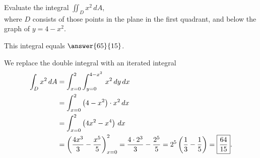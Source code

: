 \documentclass{ximera}
\author{Jim Fowler}
\begin{document}
\begin{exercise}
Evaluate the integral $\displaystyle\iint_D x^2 \, dA$, \\
where $D$ consists of those points in the plane in the first quadrant,
and below the graph of $y = 4 - x^2$.

This integral equals $\answer{65}{15}$.

\begin{hint}
 We replace the double integral with an iterated integral
     \begin{align*}
       \int_D x^2 \, dA
       &= \int_{x=0}^2 \int_{y = 0}^{4-x^2} \, x^2 \, dy \, dx \\
       &= \int_{x=0}^2 \left(4-x^2\right) \cdot x^2 \, dx \\
       &= \int_{x=0}^2 \left(4x^2-x^4\right) \, dx \\
       &= \left(\frac{4x^3}{3}-\frac{x^5}{5}\right)_{x=0}^{2} =
       \frac{4 \cdot 2^3}{3} - \frac{2^5}{5} = 2^5 \left( \frac{1}{3}
         - \frac{1}{5} \right) = \fbox{$\displaystyle\frac{64}{15}$}.
     \end{align*}
\end{hint}

\end{exercise}
\end{document}
